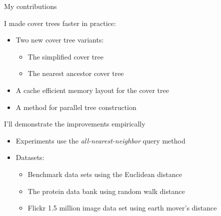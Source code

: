\begin{frame}[fragile]{My contributions}

\large

I made cover trees faster in practice:
\begin{itemize}

\item Two new cover tree variants:

\begin{itemize}
\item The simplified cover tree

\item The nearest ancestor cover tree
\end{itemize}
\large

\item A cache efficient memory layout for the cover tree

\item A method for parallel tree construction
\end{itemize}

\vspace{0.15in}
I'll demonstrate the improvements empirically
\begin{itemize}
\item Experiments use the \emph{all-nearest-neighbor} query method
\item Datasets:
\begin{itemize}
\item Benchmark data sets using the Euclidean distance
\item The protein data bank using random walk distance
\item Flickr 1.5 million image data set using earth mover's distance
\end{itemize}
\end{itemize}

\end{frame}




